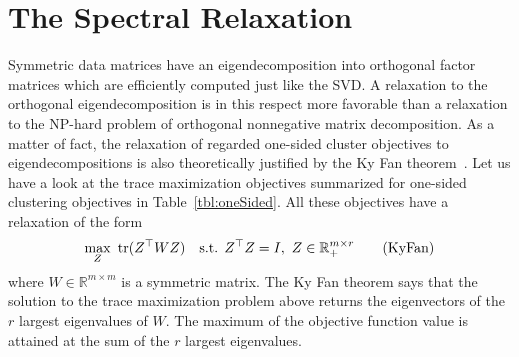 \section{The Spectral Relaxation}\label{sec:ZS:SpectralRelaxation}
Symmetric data matrices have an eigendecomposition into orthogonal factor matrices which are efficiently computed just like the SVD. A relaxation to the orthogonal eigendecomposition is in this respect more favorable than a relaxation to the NP-hard problem of orthogonal nonnegative matrix decomposition. 
As a matter of fact, the relaxation of regarded one-sided cluster objectives to eigendecompositions is also theoretically justified by the Ky Fan theorem~\citep{fan1949theorem}. Let us have a look at the trace maximization objectives summarized for one-sided clustering objectives in Table~\ref{tbl:oneSided}. All these objectives have a relaxation of the form 
\begin{align}
\max_Z&\ \operatorname*{tr}(Z^\top W Z) & \text{s.t. } Z^\top Z = I,\  Z\in\mathbb{R}_+^{m\times r} \label{eq:kyFan} \tag{KyFan}
\end{align}
where $W\in \mathbb{R}^{m\times m}$ is a symmetric matrix. The Ky Fan theorem says that the solution to the trace maximization problem above returns the eigenvectors of the $r$ largest eigenvalues of $W$. The maximum of the objective function value is attained at the sum of the $r$ largest eigenvalues. 

